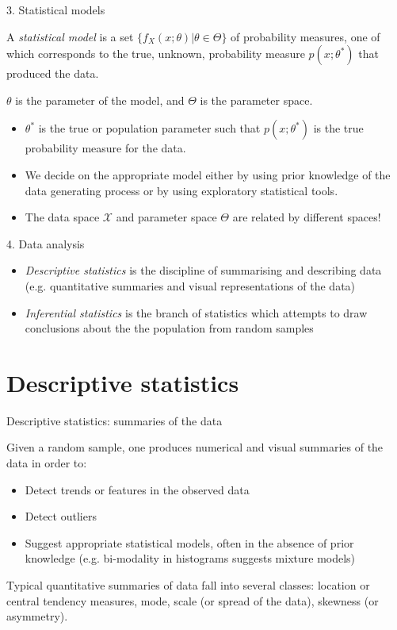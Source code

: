 \documentclass{beamer}
\begin{document}
\begin{frame}{3. Statistical models}

	\begin{block}{}
		A \textit{statistical model} is a set $\{f_X(x;\theta)| \theta \in \Theta\}$ of probability measures,
	one of which corresponds to the true, unknown, probability measure $p(x; \theta^*)$ that produced the data.
	\end{block}
	$\theta$ is the parameter of the model, and $\Theta$ is the parameter space.

	\begin{itemize}
		\item $\theta^*$ is the true or population parameter such that $p(x; \theta^*)$ is the true probability measure for the data.
		\item We decide on the appropriate model either by using prior knowledge of the data generating process or by using exploratory  statistical tools.
		\item The data space $\mathcal{X}$ and parameter space $\Theta$ are related by different spaces!
	\end{itemize}

\end{frame}

\begin{frame}{4. Data analysis}

	\begin{itemize}
		\item \textit{Descriptive statistics} is the discipline of summarising and describing data (e.g. quantitative summaries and 
	visual representations of the data)
		\item \textit{Inferential statistics} is the branch of statistics which attempts to draw conclusions about the the population from random samples
	\end{itemize}

\end{frame}

\section{Descriptive statistics}

\begin{frame}{Descriptive statistics: summaries of the data}

	Given a random sample, one produces numerical and visual summaries of the data in order to:
	\begin{itemize}
		\item Detect trends or features in the observed data
		\item Detect outliers
		\item Suggest appropriate statistical models, often in the absence of prior knowledge (e.g. bi-modality in histograms suggests mixture models)
	\end{itemize}	

	Typical quantitative summaries of data fall into several classes: location or central tendency measures,
	mode, scale (or spread of the data), skewness (or asymmetry).

\end{frame}
\end{document}
